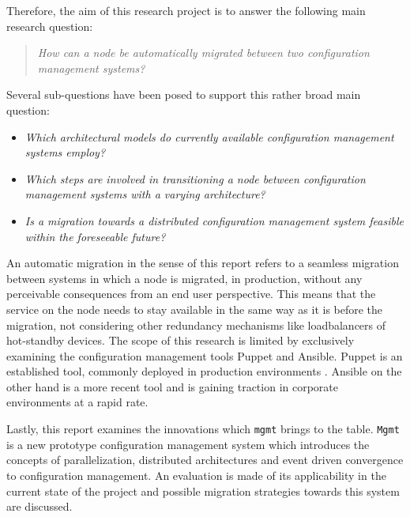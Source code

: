 Therefore, the aim of this research project is to answer the following main research question:

\begin{quote}
\textit{How can a node be automatically migrated between two configuration management systems?}
\end{quote}

\noindent
Several sub-questions have been posed to support this rather broad main question:

\begin{itemize}
	\setlength\itemsep{1pt}
    \item \textit{Which architectural models do currently available configuration management systems employ?}
    \item \textit{Which steps are involved in transitioning a node between configuration management systems with a varying architecture?}
    \item \textit{Is a migration towards a distributed configuration management system feasible within the foreseeable future?}
\end{itemize}

\noindent
An automatic migration in the sense of this report refers to a seamless migration between systems in which a node is migrated, in production, without any perceivable consequences from an end user perspective. This means that the service on the node needs to stay available in the same way as it is before the migration, not considering other redundancy mechanisms like loadbalancers of hot-standby devices. The scope of this research is limited by exclusively examining the configuration management tools Puppet and Ansible. Puppet is an established tool, commonly deployed in production environments \cite{tecosystems_2013}. Ansible on the other hand is a more recent tool and is gaining traction in corporate environments at a rapid rate.

Lastly, this report examines the innovations which \texttt{mgmt} brings to the table. \texttt{Mgmt} is a new prototype configuration management system which introduces the concepts of parallelization, distributed architectures and event driven convergence to configuration management. An evaluation is made of its applicability in the current state of the project and possible migration strategies towards this system are discussed.
